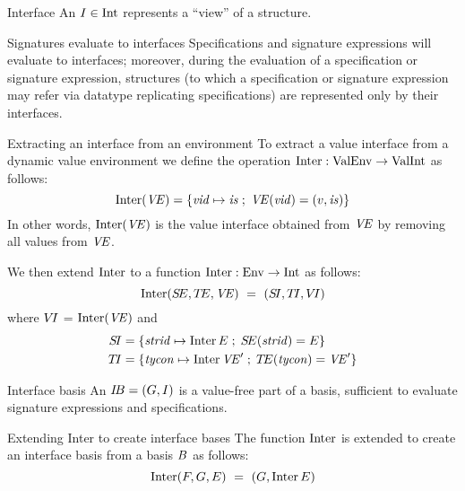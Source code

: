 \begin{definition}{Interface}
An  $I\in{\rm Int}$ represents a ``view'' of a structure.
\end{definition}


\begin{clause}{Signatures evaluate to interfaces}
Specifications and signature expressions will evaluate to interfaces;
moreover, during the evaluation of a specification or signature expression, 
structures (to which a specification or signature expression may
refer via datatype replicating specifications) are represented 
only by their interfaces.
\end{clause}

\begin{definition}{Extracting an interface from an environment}
To extract a value interface from
a dynamic value environment we define the operation $\mathop{\rm Inter}\nolimits: {\rm ValEnv} \to{\rm ValInt}$
as follows:
\begin{equation*}
\mathop{\rm Inter}\nolimits(\textit{V\kern-.05emE\/}) = \{\textit{vid\/}\mapsto\textit{is\/}\;;\;\textit{V\kern-.05emE\/}(\textit{vid\/}) = (v,\textit{is\/})\}
\end{equation*}
In other words, $\mathop{\rm Inter}\nolimits(\textit{V\kern-.05emE\/})$ is the value interface obtained from $\textit{V\kern-.05emE\/}$ by
removing all values from $\textit{V\kern-.05emE\/}$.

We then extend $\mathop{\rm Inter}\nolimits$ to a function $\mathop{\rm Inter}\nolimits:{\rm Env}\to{\rm Int}$ as follows:
\begin{equation*}
\Inter(\SE,\TE,\VE)\ =\ (\SI,\TI,\VI)
\end{equation*}
where $\mbox{$V\!I$}$ = $\mathop{\rm Inter}\nolimits(\textit{V\kern-.05emE\/})$ and 
\begin{align*}
\mbox{$S\!I$} &= \{\textit{strid\/}\mapsto\mathop{\rm Inter}\nolimits E\;;\;\mbox{$S\!E$}(\textit{strid\/}) = E\}\\
\mbox{$T\!I$} &= \{\textit{tycon\/}\mapsto\mathop{\rm Inter}\nolimits\textit{V\kern-.05emE\/}'\;;\;\mbox{$T\!E$}(\textit{tycon\/}) = \textit{V\kern-.05emE\/}'\}
\end{align*}
\end{definition}

\begin{definition}{Interface basis}
An  $\mbox{$I\!B$}=(G,I)$ is a value-free part of a
basis, sufficient to evaluate signature expressions and specifications.
\end{definition}


\begin{clause}{Extending Inter to create interface bases}
The function $\mathop{\rm Inter}\nolimits$ is extended to create an interface basis
from a basis $B$ as follows:
\begin{equation*}
\mathop{\rm Inter}\nolimits(F,G,E)\ =\ (G, \mathop{\rm Inter}\nolimits E)
\end{equation*}
\end{clause}

